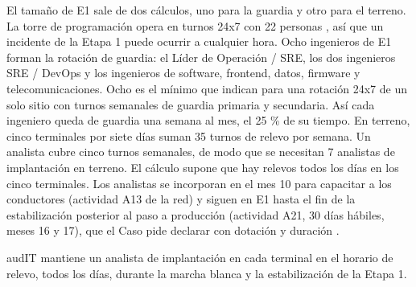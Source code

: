 El tamaño de E1 sale de dos cálculos, uno para la guardia y otro para el terreno. La torre de
programación opera en turnos 24x7 con 22 personas , así que un incidente de la
Etapa 1 puede ocurrir a cualquier hora. Ocho ingenieros de E1 forman la rotación de guardia: el Líder
de Operación / SRE, los dos ingenieros SRE / DevOps y los ingenieros de software, frontend, datos,
firmware y telecomunicaciones. Ocho es el mínimo que \textcite{beyer2016} indican para una rotación
24x7 de un solo sitio con turnos semanales de guardia primaria y secundaria. Así cada ingeniero queda
de guardia una semana al mes, el 25 \% de su tiempo. En terreno, cinco terminales por siete días
suman 35 turnos de relevo por semana. Un analista cubre cinco turnos semanales, de modo que se
necesitan 7 analistas de implantación en terreno. El cálculo supone que hay relevos todos los días en
los cinco terminales. Los analistas se incorporan en el mes 10 para capacitar a los conductores
(actividad A13 de la red) y siguen en E1 hasta el fin de la estabilización posterior al paso a
producción (actividad A21, 30 días hábiles, meses 16 y 17), que el Caso pide declarar con dotación y
duración .

\begin{compromiso}[metrica={35 turnos de relevo por semana cubiertos en los cinco terminales, de la capacitación previa a la marcha blanca hasta el fin de la estabilización de la Etapa 1},
                   verifica={registro semanal de turnos firmado por el jefe de cada terminal},
                   fuente={\caso{numeral 13.3}{27}}]
audIT mantiene un analista de implantación en cada terminal en el horario de relevo, todos los días, durante la marcha blanca y la estabilización de la Etapa 1.
\end{compromiso}

